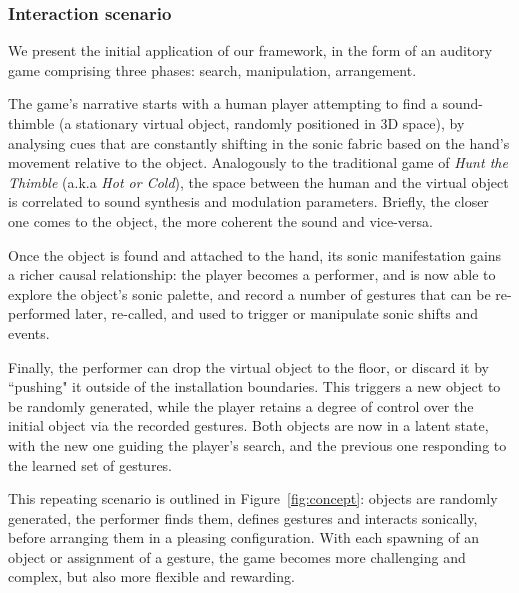 \documentclass{nime-alternate}
\begin{document}
\subsubsection{Interaction scenario}
\label{sec:scenario}

We present the initial application of our framework, in the form of an auditory game comprising three phases: search, manipulation, arrangement.

The game's narrative starts with a human player attempting to find a sound-thimble (a stationary virtual object, randomly positioned in 3D space), by analysing cues that are constantly shifting in the sonic fabric based on the hand's movement relative to the object. Analogously to the traditional game of \textit{Hunt the Thimble} (a.k.a \textit{Hot or Cold}), the space between the human and the virtual object is correlated to sound synthesis and modulation parameters. Briefly, the closer one comes to the object, the more coherent the sound and vice-versa. 

Once the object is found and attached to the hand, its sonic manifestation gains a richer causal relationship: the player becomes a performer, and is now able to explore the object's sonic palette, and record a number of gestures that can be re-performed later, re-called, and used to trigger or manipulate sonic shifts and events.

Finally, the performer can drop the virtual object to the floor, or discard it by ``pushing" it outside of the installation boundaries. This triggers a new object to be randomly generated, while the player retains a degree of control over the initial object via the recorded gestures. Both objects are now in a latent state, with the new one guiding the player's search, and the previous one responding to the learned set of gestures.

This repeating scenario is outlined in Figure~\ref{fig:concept}: objects are randomly generated, the performer finds them, defines gestures and interacts sonically, before arranging them in a pleasing configuration. With each spawning of an object or assignment of a gesture, the game becomes more challenging and complex, but also more flexible and rewarding.
\end{document}
